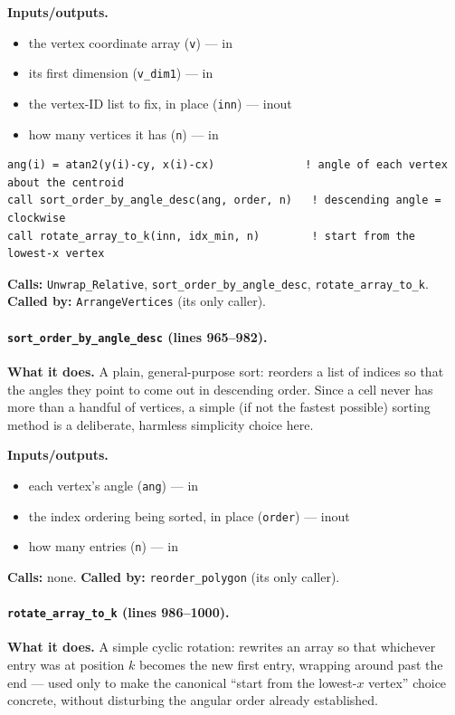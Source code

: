\documentclass[11pt]{article}
\begin{document}
\textbf{Inputs/outputs.}
\begin{itemize}[nosep]
  \item the vertex coordinate array (\texttt{v}) --- in
  \item its first dimension (\texttt{v\_dim1}) --- in
  \item the vertex-ID list to fix, in place (\texttt{inn}) --- inout
  \item how many vertices it has (\texttt{n}) --- in
\end{itemize}

\begin{lstlisting}[caption={The angle-sort-then-canonical-rotate structure of \texttt{reorder\_polygon}.}]
ang(i) = atan2(y(i)-cy, x(i)-cx)              ! angle of each vertex about the centroid
call sort_order_by_angle_desc(ang, order, n)   ! descending angle = clockwise
call rotate_array_to_k(inn, idx_min, n)        ! start from the lowest-x vertex
\end{lstlisting}

\textbf{Calls:} \texttt{Unwrap\_Relative}, \texttt{sort\_order\_by\_angle\_desc},
\texttt{rotate\_array\_to\_k}. \textbf{Called by:} \texttt{ArrangeVertices} (its only
caller).

\paragraph{\texttt{sort\_order\_by\_angle\_desc} (lines 965--982).}
\textbf{What it does.} A plain, general-purpose sort: reorders a list of indices so
that the angles they point to come out in descending order. Since a cell never has more
than a handful of vertices, a simple (if not the fastest possible) sorting method is a
deliberate, harmless simplicity choice here.

\textbf{Inputs/outputs.}
\begin{itemize}[nosep]
  \item each vertex's angle (\texttt{ang}) --- in
  \item the index ordering being sorted, in place (\texttt{order}) --- inout
  \item how many entries (\texttt{n}) --- in
\end{itemize}

\textbf{Calls:} none. \textbf{Called by:} \texttt{reorder\_polygon} (its only caller).

\paragraph{\texttt{rotate\_array\_to\_k} (lines 986--1000).}
\textbf{What it does.} A simple cyclic rotation: rewrites an array so that whichever
entry was at position $k$ becomes the new first entry, wrapping around past the end ---
used only to make the canonical ``start from the lowest-$x$ vertex'' choice concrete,
without disturbing the angular order already established.
\end{document}
